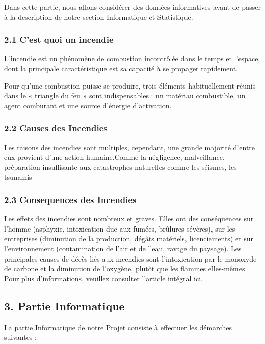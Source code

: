 \documentclass[
]{article}
\begin{document}
Dans cette partie, nous allons considérer des données informatives avant
de passer à la description de notre section Informatique et Statistique.

\subsubsection{2.1 C'est quoi un incendie}\label{cest-quoi-un-incendie}

L'incendie est un phénomène de combustion incontrôlée dans le temps et
l'espace, dont la principale caractéristique est sa capacité à se
propager rapidement.

Pour qu'une combustion puisse se produire, trois éléments habituellement
réunis dans le « triangle du feu » sont indispensables : un matériau
combustible, un agent comburant et une source d'énergie d'activation.

\subsubsection{2.2 Causes des Incendies}\label{causes-des-incendies}

Les raisons des incendies sont multiples, cependant, une grande majorité
d'entre eux provient d'une action humaine.Comme la négligence,
malveillance, préparation insuffisante aux catastrophes naturelles comme
les séismes, les tsunamis

\subsubsection{2.3 Consequences des
Incendies}\label{consequences-des-incendies}

Les effets des incendies sont nombreux et graves. Elles ont des
conséquences sur l'homme (asphyxie, intoxication due aux fumées,
brûlures sévères), sur les entreprises (diminution de la production,
dégâts matériels, licenciements) et sur l'environnement (contamination
de l'air et de l'eau, ravage du paysage). Les principales causes de
décès liés aux incendies sont l'intoxication par le monoxyde de carbone
et la diminution de l'oxygène, plutôt que les flammes elles-mêmes. Pour
plus d'informations, veuillez consulter l'article intégral ici.

\subsection{3. Partie Informatique}\label{partie-informatique}

La partie Informatique de notre Projet consiste à effectuer les
démarches suivantes :
\end{document}
